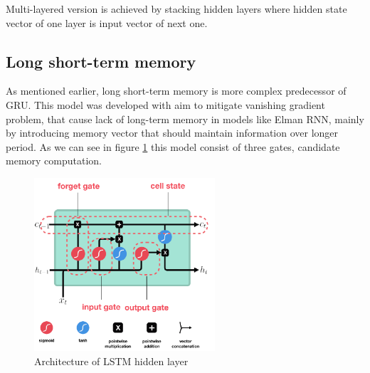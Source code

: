 Multi-layered version is achieved by stacking hidden layers where hidden state vector of one layer is input vector of next one.
 
\subsection{Long short-term memory}

As mentioned earlier, long short-term memory is more complex predecessor of GRU. This model was developed with aim to mitigate vanishing gradient problem, that cause lack of long-term memory in models like Elman RNN, mainly by introducing memory vector that should maintain information over longer period. As we can see in figure \ref{fig:lstm_arch} this model consist of three gates, candidate memory computation. 

 
\begin{figure}[!h]
	\centering
 	
	\includegraphics[width=0.6\textwidth]{images/LSTM_arch.png}
 	
 	\caption{Architecture of LSTM hidden layer}
 	\label{fig:lstm_arch}
\end{figure}